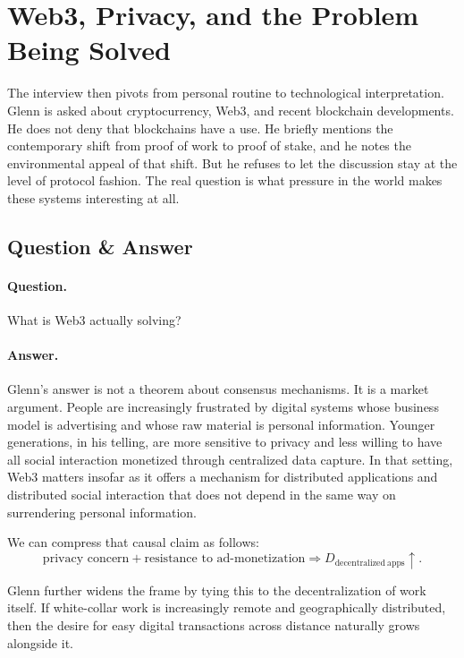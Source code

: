 \section{Web3, Privacy, and the Problem Being Solved}

The interview then pivots from personal routine to technological interpretation. Glenn is asked about cryptocurrency, Web3, and recent blockchain developments. He does not deny that blockchains have a use. He briefly mentions the contemporary shift from proof of work to proof of stake, and he notes the environmental appeal of that shift. But he refuses to let the discussion stay at the level of protocol fashion. The real question is what pressure in the world makes these systems interesting at all.

\subsection{Question \& Answer}

\paragraph{Question.} What is Web3 actually solving?

\paragraph{Answer.} Glenn's answer is not a theorem about consensus mechanisms. It is a market argument. People are increasingly frustrated by digital systems whose business model is advertising and whose raw material is personal information. Younger generations, in his telling, are more sensitive to privacy and less willing to have all social interaction monetized through centralized data capture. In that setting, Web3 matters insofar as it offers a mechanism for distributed applications and distributed social interaction that does not depend in the same way on surrendering personal information.

We can compress that causal claim as follows:
\begin{equation}
\text{privacy concern} + \text{resistance to ad-monetization}
\Longrightarrow D_{\mathrm{decentralized\ apps}}\uparrow.
\end{equation}

Glenn further widens the frame by tying this to the decentralization of work itself. If white-collar work is increasingly remote and geographically distributed, then the desire for easy digital transactions across distance naturally grows alongside it.

